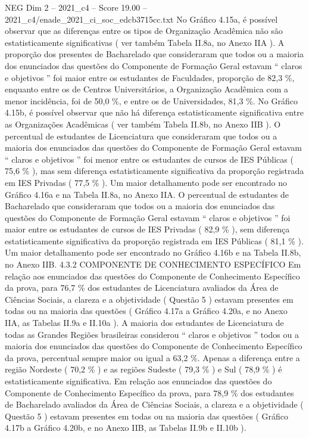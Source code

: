 \begin{textsample}{NEG Dim 2 – 2021\_c4 – Score 19.00 – 2021\_c4/enade\_2021\_ci\_soc\_edcb3715cc.txt}
No Gráfico 4.15a, é possível observar que as diferenças entre os tipos de Organização Acadêmica não são estatisticamente significativas ( ver também Tabela II.8a, no Anexo IIA ).
A proporção dos presentes de Bacharelado que consideraram que todos ou a maioria dos enunciados das questões do Componente de Formação Geral estavam “ claros e objetivos ” foi maior entre os estudantes de Faculdades, proporção de 82,3 \%, enquanto entre os de Centros Universitários, a Organização Acadêmica com a menor incidência, foi de 50,0 \%, e entre os de Universidades, 81,3 \%.
No Gráfico 4.15b, é possível observar que não há diferença estatisticamente significativa entre as Organizações Acadêmicas ( ver também Tabela II.8b, no Anexo IIB ).
O percentual de estudantes de Licenciatura que consideraram que todos ou a maioria dos enunciados das questões do Componente de Formação Geral estavam “ claros e objetivos ” foi menor entre os estudantes de cursos de IES Públicas ( 75,6 \% ), mas sem diferença estatisticamente significativa da proporção registrada em IES Privadas ( 77,5 \% ).
Um maior detalhamento pode ser encontrado no Gráfico 4.16a e na Tabela II.8a, no Anexo IIA.
O percentual de estudantes de Bacharelado que consideraram que todos ou a maioria dos enunciados das questões do Componente de Formação Geral estavam “ claros e objetivos ” foi maior entre os estudantes de cursos de IES Privadas ( 82,9 \% ), sem diferença estatisticamente significativa da proporção registrada em IES Públicas ( 81,1 \% ).
Um maior detalhamento pode ser encontrado no Gráfico 4.16b e na Tabela II.8b, no Anexo IIB. 4.3.2 COMPONENTE DE CONHECIMENTO ESPECÍFICO Em relação aos enunciados das questões do Componente de Conhecimento Específico da prova, para 76,7 \% dos estudantes de Licenciatura avaliados da Área de Ciências Sociais, a clareza e a objetividade ( Questão 5 ) estavam presentes em todas ou na maioria das questões ( Gráfico 4.17a a Gráfico 4.20a, e no Anexo IIA, as Tabelas II.9a e II.10a ).
A maioria dos estudantes de Licenciatura de todas as Grandes Regiões brasileiras considerou “ claros e objetivos ” todos ou a maioria dos enunciados das questões do Componente de Conhecimento Específico da prova, percentual sempre maior ou igual a 63,2 \%.
Apenas a diferença entre a região Nordeste ( 70,2 \% ) e as regiões Sudeste ( 79,3 \% ) e Sul ( 78,9 \% ) é estatisticamente significativa.
Em relação aos enunciados das questões do Componente de Conhecimento Específico da prova, para 78,9 \% dos estudantes de Bacharelado avaliados da Área de Ciências Sociais, a clareza e a objetividade ( Questão 5 ) estavam presentes em todas ou na maioria das questões ( Gráfico 4.17b a Gráfico 4.20b, e no Anexo IIB, as Tabelas II.9b e II.10b ).

\end{textsample}
